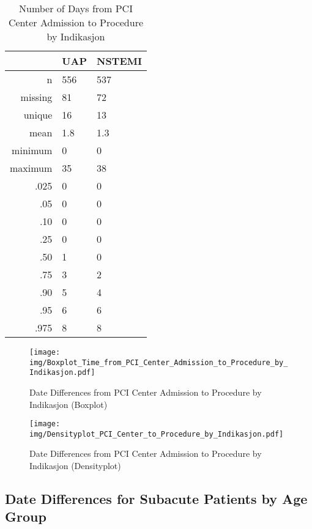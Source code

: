 \documentclass[a4paper]{report}
\begin{document}
\begin{itemize}
{%
\begin{table}[ht]
\centering
\begin{tabular}{rll}
  \toprule
 & UAP & NSTEMI \\ 
  \midrule
n & 556 & 537 \\ 
  missing & 81 & 72 \\ 
  unique & 16 & 13 \\ 
  mean & 1.8 & 1.3 \\ 
  minimum & 0 & 0 \\ 
  maximum & 35 & 38 \\ 
  .025 & 0 & 0 \\ 
  .05 & 0 & 0 \\ 
  .10 & 0 & 0 \\ 
  .25 & 0 & 0 \\ 
  .50 & 1 & 0 \\ 
  .75 & 3 & 2 \\ 
  .90 & 5 & 4 \\ 
  .95 & 6 & 6 \\ 
  .975 & 8 & 8 \\ 
   \bottomrule
\end{tabular}
\caption{Number of Days from PCI Center Admission to Procedure by Indikasjon} 
\end{table}
\begin{figure}
  \centering
  \caption{Date Differences from PCI Center Admission to Procedure by Indikasjon (Boxplot)}
  \label{Boxplot: Date Differences from PCI Center Admission to Procedure by Indikasjon}
\texttt{[image: img/Boxplot\_Time\_from\_PCI\_Center\_Admission\_to\_Procedure\_by\_Indikasjon.pdf]}\end{figure}


\begin{figure}
  \centering
  \caption{Date Differences from PCI Center Admission to Procedure by Indikasjon (Densityplot)}
  \label{Density: Date Differences from PCI Center Admission to Procedure by Indikasjon}
\texttt{[image: img/Densityplot\_PCI\_Center\_to\_Procedure\_by\_Indikasjon.pdf]}\end{figure}







\clearpage
\subsection{Date Differences for Subacute Patients by Age Group}

}
\end{itemize}
\end{document}
